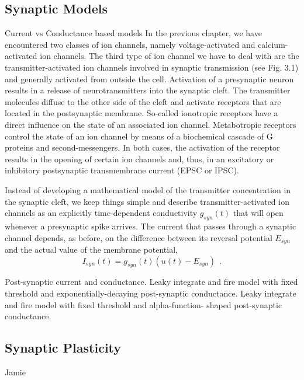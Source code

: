\subsection{Synaptic Models} 
Current vs Conductance based models 
In the previous chapter, we have encountered two classes of ion channels, namely voltage-activated and calcium-activated ion channels. The third type of ion channel we have to deal with are the transmitter-activated ion channels involved in synaptic transmission (see Fig. 3.1) and generally activated from outside the cell. Activation of a presynaptic neuron results in a release of neurotransmitters into the synaptic cleft. The transmitter molecules diffuse to the other side of the cleft and activate receptors that are located in the postsynaptic membrane. So-called ionotropic receptors have a direct influence on the state of an associated ion channel. Metabotropic receptors control the state of an ion channel by means of a biochemical cascade of G proteins and second-messengers. In both cases, the activation of the receptor results in the opening of certain ion channels and, thus, in an excitatory or inhibitory postsynaptic transmembrane current (EPSC or IPSC).


Instead of developing a mathematical model of the transmitter concentration in the synaptic cleft, we keep things simple and describe transmitter-activated ion channels as an explicitly time-dependent conductivity $g_{syn}(t)$ that will open whenever a presynaptic spike arrives. The current that passes through a synaptic channel depends, as before, on the difference between its reversal potential $E_{syn}$ and the actual value of the membrane potential,
\begin{equation}
I_{syn}(t)=g_{syn}(t)(u(t)-E_{syn})~~.
\end{equation}

Post-synaptic current and conductance.
Leaky integrate and fire model with fixed threshold and exponentially-decaying post-synaptic conductance.
Leaky integrate and fire model with fixed threshold and alpha-function- shaped post-synaptic conductance.


\subsection{Synaptic Plasticity}
Jamie

